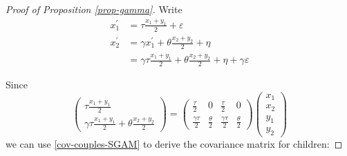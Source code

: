 \documentclass[
]{article}
\theoremstyle{definition}
\theoremstyle{definition}
\theoremstyle{definition}
\theoremstyle{definition}
\theoremstyle{remark}
\begin{document}
\begin{proof}[Proof of Proposition \ref{prop-gamma}]
Write
\begin{align*}
x_{1}^{\prime}  &=\tau\frac{x_{1}+y_{1}}{2}+\varepsilon \\
x_{2}^{\prime}  &=\gamma x_{1}^{\prime}+\theta\frac{x_{2}+y_{2}}{2}+\eta \\
                  &=\gamma\tau \frac{x_{1}+y_{1}}{2} + \theta \frac{x_{2}+y_{2}}{2} 
                    + \eta + \gamma\varepsilon
\end{align*}

Since
\[
\left(\begin{array}{c}
\tau\frac{x_{1}+y_{1}}{2}\\
\gamma\tau\frac{x_{1}+y_{1}}{2}+\theta\frac{x_{2}+y_{2}}{2}
\end{array}\right)=\left(\begin{array}{cccc}
\frac{\tau}{2} & 0 & \frac{\tau}{2} & 0\\
\frac{\gamma\tau}{2} & \frac{\theta}{2} & \frac{\gamma\tau}{2} & \frac{\theta}{2}
\end{array}\right)\left(\begin{array}{c}
x_{1}\\
x_{2}\\
y_{1}\\
y_{2}
\end{array}\right)
\]
we can use \eqref{cov-couples-SGAM} to derive the covariance matrix for children:


\end{proof}
\end{document}
